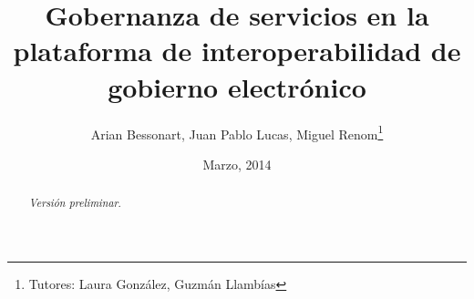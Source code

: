 \documentclass[11pt]{report}
\title{Gobernanza de servicios en la plataforma de interoperabilidad de gobierno electrónico}
\author{Arian Bessonart, Juan Pablo Lucas, Miguel Renom\thanks{Tutores: Laura González, Guzmán Llambías}}
\date{Marzo, 2014}
\begin{document}
	\maketitle
	\pagebreak

	\begin{abstract}
		\emph{Versión preliminar}.
	\end{abstract}
	\pagebreak

	\tableofcontents
	\pagebreak

	
	
	
	
	
	
	

	
	
\end{document}
